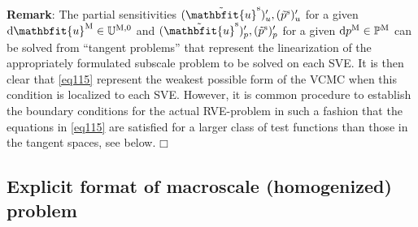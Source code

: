 \documentclass[12pt,a4paper]{article}
\renewcommand{\ta}[1]{\mathbfit{#1}}
\renewcommand{\ts}[1]{\mathbfit{#1}}
\renewcommand{\Box}{\mdlgwhtsquare}
\newcommand{\volume}{|\Omega_\rve|}
\newcommand{\rve}{
  {\mathchoice
   {\mbox{\scalebox{0.67}{$\Box$}}}
   {\mbox{\scalebox{0.67}{$\Box$}}}
   {\mbox{\scalebox{0.5}{$\Box$}}}
   {\mbox{\scalebox{0.375}{$\Box$}}}
  }
}
\begin{document}
\textbf{Remark}: The partial sensitivities $(\tilde{\ta{u}}^\fluct)'_u, (\tilde{p}^\fluct)'_u$ for a given $\dif\ta{u}^\macro\in \set{U}^{\macro,0}$ and $(\tilde{\ta{u}}^\fluct)'_p, (\tilde{p}^\fluct)'_p$ for a given $\operatorname{d \!} p^{\mathrm{M}}\in \mathbb{P}^{\mathrm{M}}$ can be solved from ``tangent problems'' that represent the linearization of the appropriately formulated subscale problem to be solved on each SVE.
It is then clear that \cref{eq115} represent the weakest possible form of the VCMC when this condition is localized to each SVE.
However, it is common procedure to establish the boundary conditions for the actual RVE-problem in such a fashion that the equations in \cref{eq115} are satisfied for a larger class of test functions than those in the tangent spaces, see below. $\Box$
%

\subsection{Explicit format of macroscale (homogenized) problem}
\end{document}
